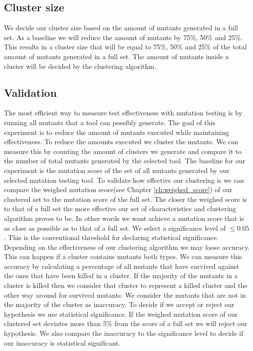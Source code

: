 \documentclass[../main]{subfiles}
\begin{document}
\subsection{Cluster size}
We decide our cluster size based on the amount of mutants generated in a full set.
As a baseline we will reduce the amount of mutants by 75\%, 50\% and 25\%.
This results in a cluster size that will be equal to 75\%, 50\% and 25\% of the total amount of mutants generated in a full set.
The amount of mutants inside a cluster will be decided by the clustering algorithm.

\subsection{Validation}
The most efficient way to measure test effectiveness with mutation testing is by running all mutants that a tool can possibly generate.
The goal of this experiment is to reduce the amount of mutants executed while maintaining effectiveness.
To reduce the amounts executed we cluster the mutants. 
We can measure this by counting the amount of clusters we generate and compare it to the number of total mutants generated by the selected tool.
\newline
The baseline for our experiment is the mutation score of the set of all mutants generated by our selected mutation testing tool.
\newline
To validate how effective our clustering is we can compare the weighed mutation score(see Chapter \ref{ch:weighed_score}) of our clustered set to the mutation score of the full set.
The closer the weighed score is to that of a full set the more effective our set of characteristics and clustering algorithm proves to be.
In other words we want achieve a mutation score that is as close as possible as to that of a full set.
We select a significance level of $\leq 0.05$.
This is the conventional threshold for declaring statistical significance\cite{Kirk1996PracticalCome}.
\newline
Depending on the effectiveness of our clustering algorithm we may loose accuracy.
This can happen if a cluster contains mutants both types. 
We can measure this accuracy by calculating a percentage of all mutants that have survived against the ones that have been killed in a cluster.
If the majority of the mutants in a cluster is killed then we consider that cluster to represent a killed cluster and the other way around for survived mutants.
We consider the mutants that are not in the majority of the cluster as inaccuracy.
\newline
To decide if we accept or reject our hypothesis we use statistical significance\cite{Kirk1996PracticalCome}.
If the weighed mutation score of our clustered set deviates more than 5\% from the score of a full set we will reject our hypothesis.
We also compare the inaccuracy to the significance level to decide if our inaccuracy is statistical significant.
\end{document}
